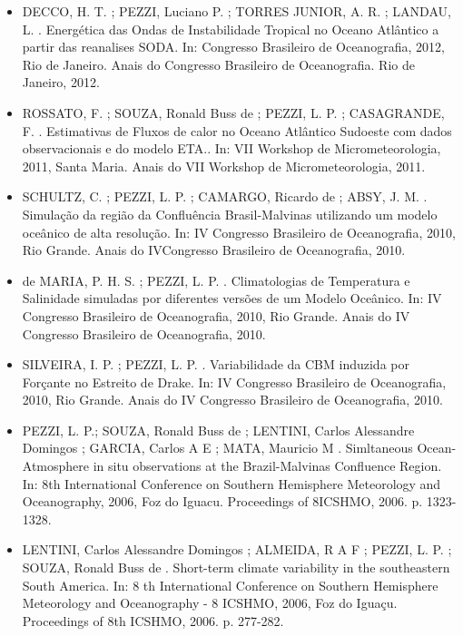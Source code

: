 \documentclass[11pt, a4paper]{awesome-cv}
\begin{document}
\begin{cvletter}
\begin{itemize}
\item[] DECCO, H. T. ; PEZZI, Luciano P. ; TORRES JUNIOR, A. R. ; LANDAU, L. . Energética das Ondas de Instabilidade Tropical no Oceano Atlântico a partir das reanalises SODA. In: Congresso Brasileiro de Oceanografia, 2012, Rio de Janeiro. Anais do Congresso Brasileiro de Oceanografia. Rio de Janeiro, 2012. 

\item[] ROSSATO, F. ; SOUZA, Ronald Buss de ; PEZZI, L. P. ; CASAGRANDE, F. . Estimativas de Fluxos de calor no Oceano Atlântico Sudoeste com dados observacionais e do modelo ETA.. In: VII Workshop de Micrometeorologia, 2011, Santa Maria. Anais do VII Workshop de Micrometeorologia, 2011.

\item[] SCHULTZ, C. ; PEZZI, L. P. ; CAMARGO, Ricardo de ; ABSY, J. M. . Simulação da região da Confluência Brasil-Malvinas utilizando um modelo oceânico de alta resolução. In: IV Congresso Brasileiro de Oceanografia, 2010, Rio Grande. Anais do IVCongresso Brasileiro de Oceanografia, 2010. 

\item[] de MARIA, P. H. S. ; PEZZI, L. P. . Climatologias de Temperatura e Salinidade simuladas por diferentes versões de um Modelo Oceânico. In: IV Congresso Brasileiro de Oceanografia, 2010, Rio Grande. Anais do IV Congresso Brasileiro de Oceanografia, 2010.

\item[] SILVEIRA, I. P. ; PEZZI, L. P. . Variabilidade da CBM induzida por Forçante no Estreito de Drake. In: IV Congresso Brasileiro de Oceanografia, 2010, Rio Grande. Anais do IV Congresso Brasileiro de Oceanografia, 2010. 

\item[] PEZZI, L. P.; SOUZA, Ronald Buss de ; LENTINI, Carlos Alessandre Domingos ; GARCIA, Carlos A E ; MATA, Mauricio M . Simltaneous Ocean-Atmosphere in situ observations at the Brazil-Malvinas Confluence Region. In: 8th International Conference on Southern Hemisphere Meteorology and Oceanography, 2006, Foz do Iguacu. Proceedings of 8ICSHMO, 2006. p. 1323-1328. 

\item[] LENTINI, Carlos Alessandre Domingos ; ALMEIDA, R A F ; PEZZI, L. P. ; SOUZA, Ronald Buss de . Short-term climate variability in the southeastern South America. In: 8 th International Conference on Southern Hemisphere Meteorology and Oceanography - 8 ICSHMO, 2006, Foz do Iguaçu. Proceedings of 8th ICSHMO, 2006. p. 277-282. 


\end{itemize}
\end{cvletter}
\end{document}
